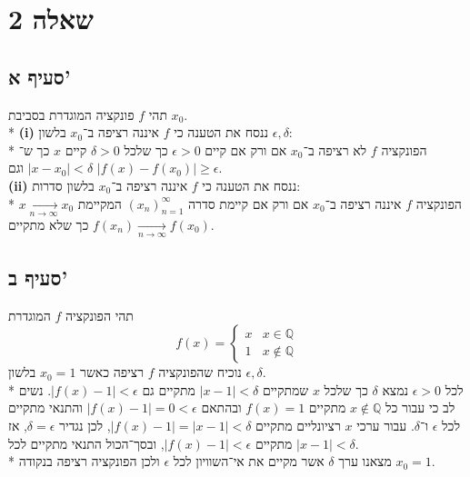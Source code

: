 \documentclass[a4paper]{article}
\def\QQ{\mathbb{Q}}
\begin{document}
\section{שאלה 2}
\subsection{סעיף א'}
תהי $f$ פונקציה המוגדרת בסביבת $x_0$. \\*
\textbf{(i)}
ננסח את הטענה כי $f$ איננה רציפה ב־$x_0$ בלשון $\epsilon, \delta$: \\*
הפונקציה $f$ לא רציפה ב־$x_0$ אם ורק אם קיים $\epsilon > 0$ כך שלכל $\delta > 0$ קיים $x$ כך ש־$|x - x_0| < \delta$ וגם $|f(x) - f(x_0)| \ge \epsilon$. \\
\textbf{(ii)}
ננסח את הטענה כי $f$ איננה רציפה ב־$x_0$ בלשון סדרות: \\*
הפונקציה $f$ איננה רציפה ב־$x_0$ אם ורק אם קיימת סדרה ${(x_n)}_{n = 1}^\infty$ המקיימת $x \underset{n \to \infty}{\rightarrow} x_0$
כך שלא מתקיים $f(x_n) \underset{n \to \infty}{\rightarrow} f(x_0)$.

\subsection{סעיף ב'}
תהי הפונקציה $f$ המוגדרת
\[
	f(x) = \begin{cases}
		x & x \in \QQ \\
		1 & x \notin \QQ
	\end{cases}
\]
נוכיח שהפונקציה $f$ רציפה כאשר $x_0 = 1$ בלשון $\epsilon, \delta$. \\*
לכל $\epsilon > 0$ נמצא $\delta$ כך שלכל $x$ שמתקיים $|x - 1| < \delta$ מתקיים גם $|f(x) - 1| < \epsilon$.
נשים לב כי עבור כל $x \notin \QQ$ מתקיים $f(x) = 1$ ובהתאם $|f(x) - 1| = 0 < \epsilon$ והתנאי מתקיים לכל $\epsilon$ ו־$\delta$.
עבור ערכי $x$ רציונליים מתקיים $|f(x) - 1| = |x - 1| < \delta$, לכן נגדיר $\delta = \epsilon$, אז מתקיים $|f(x) - 1| < \epsilon$,
ובסך־הכול התנאי מתקיים לכל $|x - 1| < \delta$. \\*
מצאנו ערך $\delta$ אשר מקיים את אי־השוויון לכל $\epsilon$ ולכן הפונקציה רציפה בנקודה $x_0 = 1$.
\end{document}
